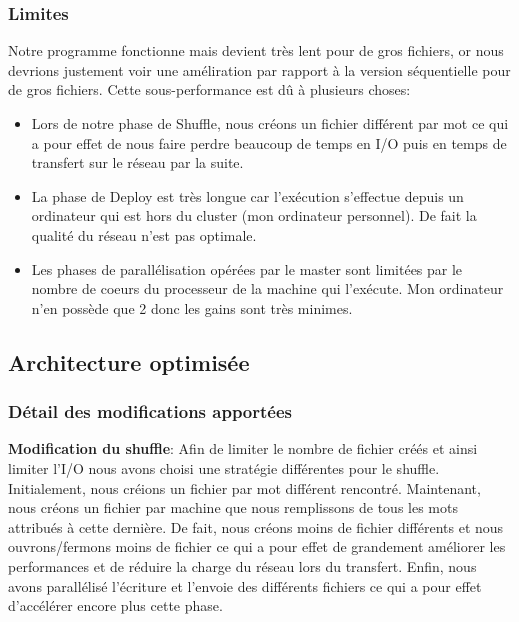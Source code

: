 \documentclass{article}
\begin{document}
\subsubsection{Limites}

Notre programme fonctionne mais devient très lent pour de gros fichiers, or nous devrions justement voir une améliration par rapport à la version séquentielle pour de gros fichiers.
Cette sous-performance est dû à plusieurs choses:
\begin{itemize}
    \item Lors de notre phase de Shuffle, nous créons un fichier différent par mot ce qui a pour effet de nous faire perdre beaucoup de temps en I/O puis en temps de transfert sur le réseau par la suite.
    \item La phase de Deploy est très longue car l'exécution s'effectue depuis un ordinateur qui est hors du cluster (mon ordinateur personnel). De fait la qualité du réseau n'est pas optimale.
    \item Les phases de parallélisation opérées par le master sont limitées par le nombre de coeurs du processeur de la machine qui l'exécute. Mon ordinateur n'en possède que 2 donc les gains sont très minimes.
\end{itemize}


\subsection{Architecture optimisée}
\subsubsection{Détail des modifications apportées}
\textbf{Modification du shuffle}: Afin de limiter le nombre de fichier créés et ainsi limiter l'I/O nous avons choisi une stratégie différentes pour le shuffle. Initialement,
nous créions un fichier par mot différent rencontré. Maintenant, nous créons un fichier par machine que nous remplissons de tous les mots attribués à cette dernière. De fait, nous créons moins de fichier différents et 
nous ouvrons/fermons moins de fichier ce qui a pour effet de grandement améliorer les performances et de réduire la charge du réseau lors du transfert. Enfin, nous avons parallélisé l'écriture et l'envoie des différents 
fichiers ce qui a pour effet d'accélérer encore plus cette phase.
\end{document}
